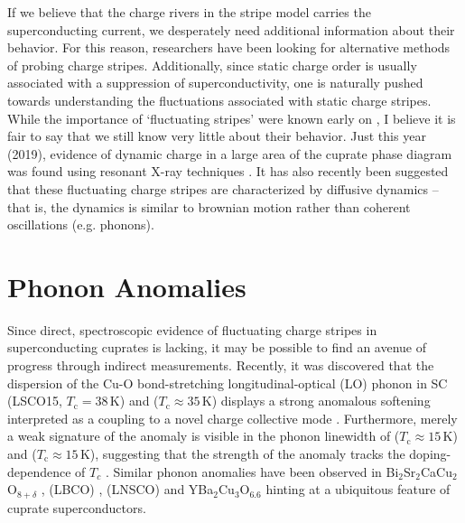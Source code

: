 If we believe that the charge rivers in the stripe model carries the superconducting current, we desperately need additional information about their behavior. For this reason, researchers have been looking for alternative methods of probing charge stripes. Additionally, since static charge order is usually associated with a suppression of superconductivity, one is naturally pushed towards understanding the fluctuations associated with static charge stripes. While the importance of `fluctuating stripes' were known early on \cite{Kivelson2003}, I believe it is fair to say that we still know very little about their behavior. Just this year (2019), evidence of dynamic charge in a large area of the cuprate phase diagram was found using resonant X-ray techniques \cite{Arpaia2019}. It has also recently been suggested that these fluctuating charge stripes are characterized by diffusive dynamics \cite{Mitrano2019} -- that is, the dynamics is similar to brownian motion rather than coherent oscillations (e.g. phonons).

\section{Phonon Anomalies}
Since direct, spectroscopic evidence of fluctuating charge stripes in superconducting cuprates is lacking, it may be possible to find an avenue of progress through indirect measurements. Recently, it was discovered that the dispersion of the Cu-O bond-stretching longitudinal-optical (LO) phonon in SC \LSCOopt{} (LSCO15, $T_\text{c} = 38\,\text{K}$) \cite{Reznik2007} and \LSCOTwenty{} ($T_\text{c} \approx 35\,\text{K}$) \cite{Park2014} displays a strong anomalous softening interpreted as a coupling to a novel charge collective mode \cite{Park2014}. Furthermore, merely a weak signature of the anomaly is visible in the phonon linewidth of \LSCOseven{} ($T_\text{c} \approx 15\,\text{K}$)  and \LSCOTwentyfive{} ($T_\text{c} \approx 15\,\text{K}$), suggesting that the strength of the anomaly tracks the doping-dependence of $T_c$ \cite{Park2014}. Similar phonon anomalies have been observed in Bi$_2$Sr$_2$CaCu$_2$O$_{8+\delta}$ \cite{Chaix2017}, \LBCOtwelve{} (LBCO) \cite{Reznik2006}, \LNSCO{} (LNSCO) \cite{Reznik2007} and YBa$_2$Cu$_3$O$_{6.6}$ \cite{LeTacon2014} hinting at a ubiquitous feature of cuprate superconductors.


